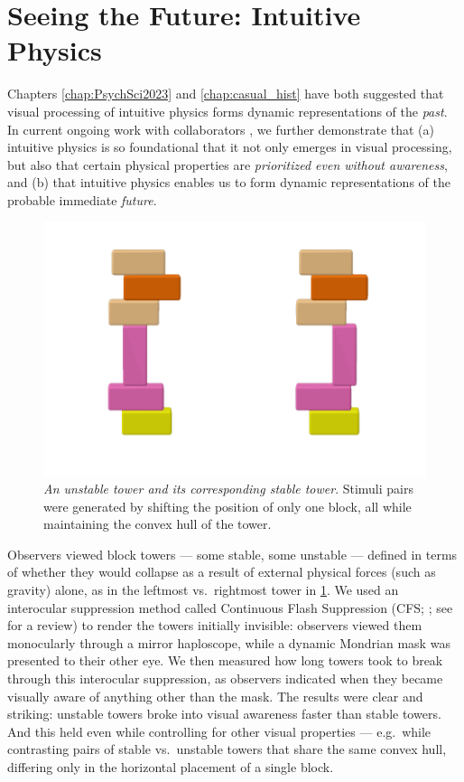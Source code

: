 \section{Seeing the Future: Intuitive Physics}\label{sec:stability_cfs}
Chapters \ref{chap:PsychSci2023} and \ref{chap:casual_hist} have both suggested that visual processing of intuitive physics forms dynamic representations of the \textit{past}.  In current ongoing work with collaborators \parencite{wong_unconscious_2024}, we further demonstrate that (a) intuitive physics is so foundational that it not only emerges in visual processing, but also that certain physical properties are \textit{prioritized even without awareness}, and (b) that intuitive physics enables us to form dynamic representations of the probable immediate \textit{future}.  

\begin{figure}[ht]
    \centering
    \includegraphics[width=\textwidth]{figures/DiscussFigs/stableunstable-pink.png}
    \caption
    {\textit{An unstable tower and its corresponding stable tower}. Stimuli pairs were generated by shifting the position of only one block, all while maintaining the convex hull of the tower.}
    \label{fig:DiscussFig_1}
\end{figure}

Observers viewed block towers --- some stable, some unstable --- defined in terms of whether they would collapse as a result of external physical forces (such as gravity) alone, as in the leftmost vs.~rightmost tower in \cref{fig:DiscussFig_1}.  We used an interocular suppression method called Continuous Flash Suppression (CFS; \cite{tsuchiya_continuous_2005}; see \cite{stein_breaking_2019} for a review) to render the towers initially invisible: observers viewed them monocularly through a mirror haploscope, while a dynamic Mondrian mask was presented to their other eye. We then measured how long towers took to break through this interocular suppression, as observers indicated when they became visually aware of anything other than the mask.  The results were clear and striking: unstable towers broke into visual awareness faster than stable towers. And this held even while controlling for other visual properties --- e.g.~while contrasting pairs of stable vs.~unstable towers that share the same convex hull, differing only in the horizontal placement of a single block. 

